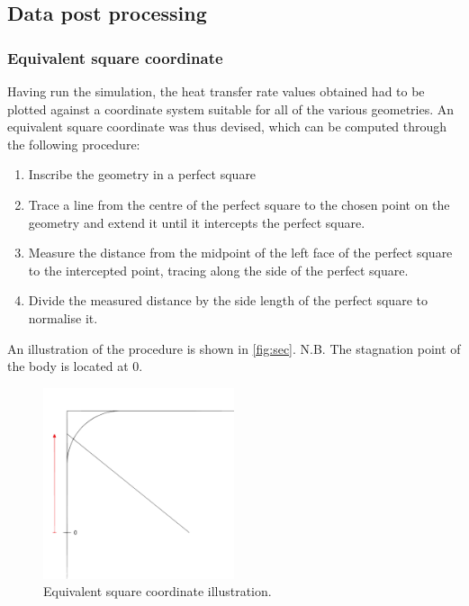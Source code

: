 \subsection{Data post processing}
\label{subsection:postprocessing}
\subsubsection{Equivalent square coordinate}

Having run the simulation, the heat transfer rate values obtained had to be plotted against a coordinate system suitable for all of the various geometries. An equivalent square coordinate was thus devised, which can be computed through the following procedure:

\begin{enumerate}
    \item Inscribe the geometry in a perfect square
    \item Trace a line from the centre of the perfect square to the chosen point on the geometry and extend it until it intercepts the perfect square.
    \item Measure the distance from the midpoint of the left face of the perfect square to the intercepted point, tracing along the side of the perfect square.
    \item Divide the measured distance by the side length of the perfect square to normalise it.
\end{enumerate}
An illustration of the procedure is shown in \autoref{fig:sec}. N.B. The stagnation point of the body is located at 0.
\begin{figure}[h]
    \centering
    \includegraphics[width=0.5\textwidth]{Images/3. Methodology/esc.pdf}
    \caption{Equivalent square coordinate illustration.}
    \label{fig:sec}
\end{figure}

